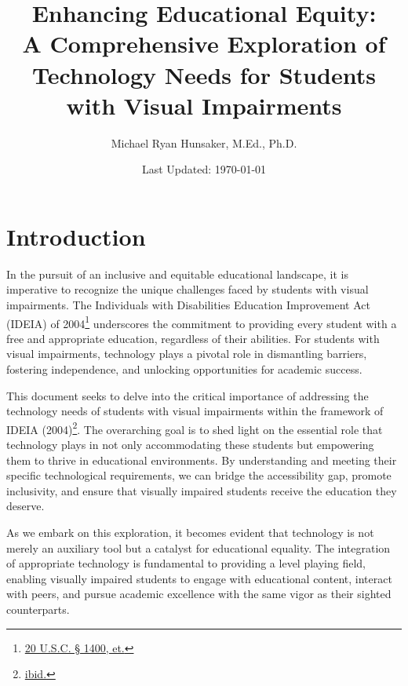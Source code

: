 \documentclass[14pt,letterpaper,twoside]{extreport}
\title{Enhancing Educational Equity: \\ A Comprehensive Exploration of Technology Needs for Students with Visual Impairments}
\author{Michael Ryan Hunsaker, M.Ed., Ph.D.}
\date{\vfill Last Updated: {\today}}
\begin{document}
\maketitle
{}
\setcounter{tocdepth}{3}
\cleardoublepage
\tableofcontents
{\listoffigures\let\clearpage\relax\vskip60pt\listoftables}
\newpage{}
\fancyhead{}
\fancyfoot{}


\hypertarget{intro}{\chapter*{Introduction}\label{intro} }

In the pursuit of an inclusive and equitable educational landscape, it is imperative to recognize the unique challenges faced by students with visual impairments. The Individuals with Disabilities Education Improvement Act (IDEIA) of 2004\footnote{\href{https://sites.ed.gov/idea/statuteregulations/}{20 U.S.C. § 1400, et.}} underscores the commitment to providing every student with a free and appropriate education, regardless of their abilities. For students with visual impairments, technology plays a pivotal role in dismantling barriers, fostering independence, and unlocking opportunities for academic success.

This document seeks to delve into the critical importance of addressing the technology needs of students with visual impairments within the framework of IDEIA (2004)\footnote{\href{https://sites.ed.gov/idea/statuteregulations/}{ibid.}}. The overarching goal is to shed light on the essential role that technology plays in not only accommodating these students but empowering them to thrive in educational environments. By understanding and meeting their specific technological requirements, we can bridge the accessibility gap, promote inclusivity, and ensure that visually impaired students receive the education they deserve.

 As we embark on this exploration, it becomes evident that technology is not merely an auxiliary tool but a catalyst for educational equality. The integration of appropriate technology is fundamental to providing a level playing field, enabling visually impaired students to engage with educational content, interact with peers, and pursue academic excellence with the same vigor as their sighted counterparts.
\end{document}
